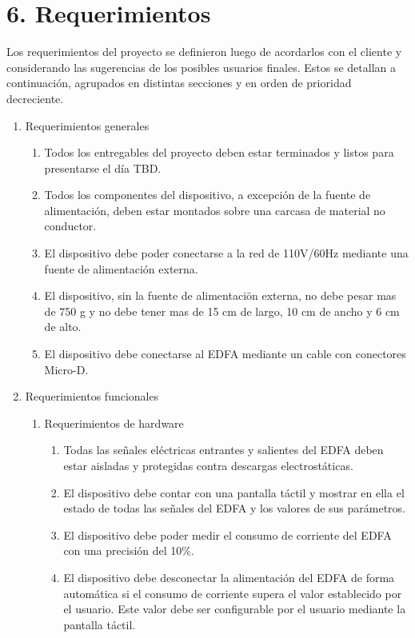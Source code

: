 \documentclass[
11pt, %
codirector, %
]{charter}
\begin{document}
\section{6. Requerimientos}
\label{sec:requerimientos}

Los requerimientos del proyecto se definieron luego de acordarlos con el cliente y considerando las sugerencias de los posibles usuarios finales. Estos se detallan a continuación, agrupados en distintas secciones y en orden de prioridad decreciente.

\begin{enumerate}
	\item Requerimientos generales
		\begin{enumerate}
			\item Todos los entregables del proyecto deben estar terminados y listos para presentarse el día TBD.
			\item Todos los componentes del dispositivo, a excepción de la fuente de alimentación, deben estar montados sobre una carcasa de material no conductor.
			\item El dispositivo debe poder conectarse a la red de 110V/60Hz mediante una fuente de alimentación externa.
			\item El dispositivo, sin la fuente de alimentaciön externa, no debe pesar mas de 750 g y no debe tener mas de 15 cm de largo, 10 cm de ancho y 6 cm de alto.
			\item El dispositivo debe conectarse al EDFA mediante un cable con conectores Micro-D.
		\end{enumerate}
	\item Requerimientos funcionales
		\begin{enumerate}
			\item Requerimientos de hardware
				\begin{enumerate}[label*=\arabic*.]
					\item Todas las señales eléctricas entrantes y salientes del EDFA deben estar aisladas y protegidas contra descargas electrostáticas.
					\item El dispositivo debe contar con una pantalla táctil y mostrar en ella el estado de todas las señales del EDFA y los valores de sus parámetros.
					\item El dispositivo debe poder medir el consumo de corriente del EDFA con una precisión del 10\%.
					\item El dispositivo debe desconectar la alimentación del EDFA de forma automática si el consumo de corriente supera el valor establecido por el usuario. Este valor debe ser configurable por el usuario mediante la pantalla táctil.

\end{enumerate}
\end{enumerate}
\end{enumerate}
\end{document}
